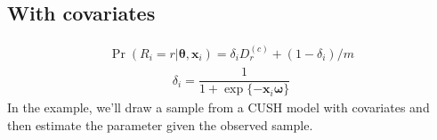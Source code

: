 \documentclass[letterpaper,10pt,english]{sphinxmanual}
\begin{document}
\subsection{With covariates}
\label{\detokenize{manual:cush-with-covariates}}\label{\detokenize{manual:id117}}
\sphinxAtStartPar
{}
\begin{equation*}
\begin{split}\Pr(R_i=r|\pmb\theta,\pmb x_i) = \delta_i D_r^{(c)} + (1-\delta_i)/m\end{split}
\end{equation*}\begin{equation*}
\begin{split}\delta_i = \dfrac{1}{1+\exp\{ - \pmb x_i \pmb\omega \}}\end{split}
\end{equation*}
\sphinxAtStartPar
In the example, we’ll draw a sample from a CUSH model with covariates and
then estimate the parameter given the observed sample.
\end{document}
